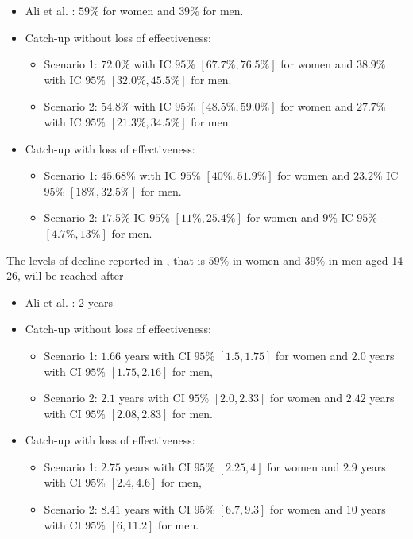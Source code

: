 \begin{itemize}
	\item Ali et al. \cite{ali2013genital}: $59\%$ for women and $39\%$ for men.
	\item Catch-up without loss of effectiveness:
	\begin{itemize}
	\item Scenario 1: $72.0\%$ with IC $95\%$ $[67.7\%, 76.5\%]$ for women and $38.9\%$ with IC $95\%$ $[32.0\%, 45.5\%]$ for men. 
	\item Scenario 2: $54.8\%$ with IC $95\%$ $[48.5\%, 59.0\%]$ for women and $27.7\%$ with IC $95\%$ $[21.3\%, 34.5\%]$ for men.
	\end{itemize} 
   	\item Catch-up with loss of effectiveness:
    	\begin{itemize}
    	\item Scenario 1: $45.68\%$ with IC $95\%$ $[40\%, 51.9\%]$ for women and $23.2\%$ IC $95\%$ $[18\%, 32.5\%]$ for men.
    	\item Scenario 2: $17.5\%$ IC $95\%$ $[11\%, 25.4\%]$ for women and $9\%$ IC $95\%$ $[4.7\%, 13\% ]$ for men.
    \end{itemize} 
\end{itemize}

The levels of decline reported in \cite{ali2013genital}, that is $59\%$ in women and $39\%$ in men aged 14-26, will be reached after

\begin{itemize}
	\item Ali et al. \cite{ali2013genital}: 2 years
	\item Catch-up without loss of effectiveness:
	\begin{itemize}
	\item Scenario 1: $1.66$ years with CI $95\%$ $[1.5, 1.75]$ for women and $2.0$ years with CI $95\%$ $[1.75, 2.16]$ for men,
	\item Scenario 2: $2.1$ years with CI $95\%$ $[2.0, 2.33]$ for women and $2.42$ years with CI $95\%$ $[2.08, 2.83]$ for men.
	\end{itemize}
	\item Catch-up with loss of effectiveness:
	\begin{itemize}
	\item Scenario 1: $2.75$ years with CI $95\%$ $[2.25, 4]$ for women and $2.9$ years with CI $95\%$ $[2.4, 4.6]$ for men,
	\item Scenario 2: $8.41$ years with CI $95\%$ $[6.7, 9.3]$ for women and $10$ years with CI $95\%$ $[6, 11.2]$ for men.
	\end{itemize} 
\end{itemize}

